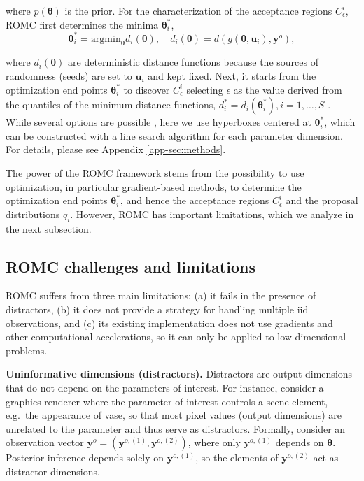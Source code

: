 \documentclass[twoside]{article}
\newlength{\secvspace}
\newlength{\subsecvspace}
\newcommand{\thb}{\boldsymbol{\theta}}
\newcommand{\ub}{\mathbf{u}}
\newcommand{\yb}{\mathbf{y}}
\newcommand{\data}{\mathbf{y}^o}
\newcommand{\accregioni}{C_{\epsilon}^i}
\begin{document}
where $p(\thb)$ is the prior. For the characterization of the acceptance regions $\accregioni$, ROMC first determines the minima $\thb_i^*$,
\begin{equation}
 \thb_i^* = \text{argmin}_{\thb} d_i(\thb),\quad d_i(\thb) = d(g(\thb, \ub_i), \data),       
 \label{eq:optim_end_points}
\end{equation}

where $d_i(\thb)$ are deterministic distance functions because the sources of randomness (seeds) are set to $\ub_i$ and kept fixed.
Next, it starts from the optimization end points $\thb_i^*$ to discover $\accregioni$ selecting $\epsilon$ as the value derived from the quantiles of the minimum distance functions, $d_i^*=d_i(\thb_i^*), i=1, \ldots, S$ \citep[see][for details]{ikonomov2020robust}. While several options are possible \citep{ikonomov2020robust}, here we use hyperboxes centered at $\thb_i^*$, which can be constructed with a line search algorithm for each parameter dimension. For details, please see Appendix \ref{app-sec:methods}.

The power of the ROMC framework stems from the possibility to use optimization, in particular gradient-based methods, to determine the optimization end points $\thb_i^*$, and hence the acceptance regions $\accregioni$ and the proposal distributions $q_i$. 
However, ROMC has important limitations, which we analyze in the next subsection.

\vspace{\subsecvspace}
\subsection{ROMC challenges and limitations}
\vspace{\subsecvspace}
\label{sec:romc-limitations}

ROMC suffers from three main limitations;
(a) it fails in the presence of distractors,
(b) it does not provide a strategy for handling multiple iid observations, and
(c) its existing implementation does not use gradients and other computational accelerations, so it can only be applied to low-dimensional problems.

\textbf{Uninformative dimensions (distractors).}
\label{sec:romc-limitation-1}
Distractors are output dimensions that do not depend on the parameters of interest. For instance, consider a graphics renderer where the parameter of interest controls a scene element, e.g.\ the appearance of vase, so that most pixel values (output dimensions) are unrelated to the parameter and thus serve as distractors.
Formally, consider an observation vector $\yb^o = (\yb^{o, (1)}, \yb^{o, (2)})$, 
where only $\yb^{o, (1)}$ depends on $\thb$.
Posterior inference depends solely on $\yb^{o, (1)}$, so the elements of $\yb^{o, (2)}$ act as distractor dimensions.
\end{document}

